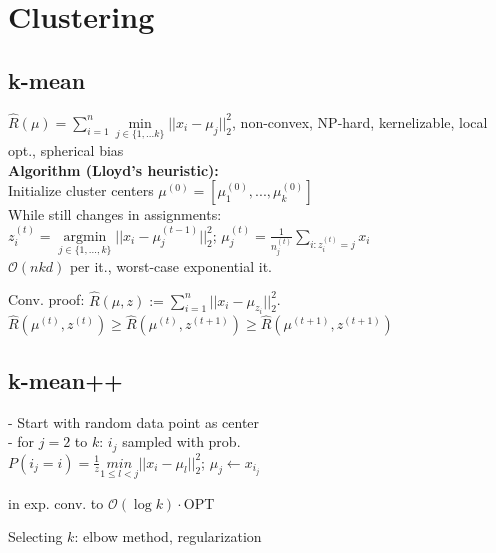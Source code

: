 \section*{Clustering}
\subsection*{k-mean}
$\hat{R}(\mu) = \sum_{i=1}^n \underset{j\in\{1,...k\}}{\operatorname{min}}||x_i-\mu_j||_2^2$, 
non-convex, NP-hard, kernelizable, local opt., spherical bias\\
\textbf{Algorithm (Lloyd's heuristic):}\\
Initialize cluster centers $\mu^{(0)} = [\mu_1^{(0)},...,\mu_k^{(0)}]$\\
While still changes in assignments:\\
$z_i^{(t)} = \underset{j\in\{1,...,k\}}{\operatorname{argmin}}||x_i - \mu_j^{(t-1)}||_2^2$; $\mu_j^{(t)} = \frac{1}{n_j^{(t)}}\sum_{i:z_i^{(t)}=j}x_i$\\
\(\mathcal{O}(nkd)\)  per it., worst-case exponential it. 

Conv. proof: \(\hat{R}(\mu, z) := \sum_{i = 1}^n ||x_i - \mu_{z_i}||_2^2\).
\(\hat{R}(\mu^{(t)}, z^{(t)}) \geq \hat{R}(\mu^{(t)}, z^{(t+1)}) \geq \hat{R}(\mu^{(t+1)}, z^{(t+1)})\) 
\subsection*{k-mean++}
- Start with random data point as center\\
- for $j=2$ to $k$:
$i_j$ sampled with prob.\\
$P(i_j=i) = \frac{1}{z} \underset{1\leq l<j}{min}||x_i-\mu_l||_2^2$; $\mu_j \leftarrow x_{i_j}$

in exp. conv. to \(\mathcal{O}(\log k) \cdot \)OPT

Selecting \(k\): elbow method, regularization
